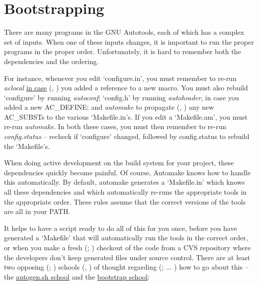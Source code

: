\chapter{Bootstrapping}\label{C_Bootstrapping}


There are many programs in the GNU Autotools, each of which has a complex set 
of inputs. When one of these inputs changes, it is important to run the 
proper programs in the proper order. Unfortunately, it is hard to remember 
both the dependencies and the ordering. 

For instance, whenever you edit `configure.in', you must remember to re-run 
{\it aclocal} \underline{in case} ({\MaQ{}}, {\MaQ{}}) you 
added a reference to a new macro. You must also rebuild `configure' 
by running {\it autoconf}; `config.h' by running {\it autoheader},
in case you added a new AC\_{}DEFINE; and {\it automake}
to propagate ({\MhQ{}}, {\MaQ{}}) any new AC\_{}SUBSTs to the various `Makefile.in's.
If you edit a `Makefile.am', you must re-run {\it automake}.
In both these cases, you must then remember 
to re-run {\it config.status} -- recheck if `configure' changed, followed 
by config.status to rebuild the `Makefile's. 


When doing active development on the build system for your project,
these dependencies quickly become painful. Of course,
Automake 
knows how to handle this automatically.
By default, automake generates a `Makefile.in' 
which knows all these dependencies and which automatically re-runs the 
appropriate tools in the appropriate order. These rules assume that the 
correct versions of the tools are all in your PATH. 


It helps to have a script ready to do all of this for you once, before you 
have generated a `Makefile' that will automatically run the tools in 
the correct order, or when you make a fresh ({\MbQ{}}; {\MbQ{}})
checkout of the code from a CVS repository where the developers don't 
keep generated files under source control. There are at least two 
opposing ({\MaQ{}}; {\MbQ{}}) schools ({\MaQ{}}, {\MbQ{}}) of 
thought regarding ({\McQ{}}; {\MaQ{}}... {\McQ{}}) how to go about 
this -- the \underline{autogen.sh school}
and the \underline{bootstrap school}: 

